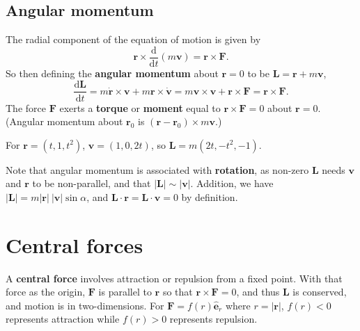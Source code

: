 \documentclass[letter-paper]{tufte-book}
\newenvironment{example}[1][Example]{\begin{trivlist}
\item[\hskip \labelsep {\bfseries #1}]}{\end{trivlist}}
\newcommand{\eb}{\boldsymbol{e}}
\newcommand{\Fb}{\boldsymbol{F}}
\newcommand{\Lb}{\boldsymbol{L}}
\newcommand{\rb}{\boldsymbol{r}}
\newcommand{\vb}{\boldsymbol{v}}
\newcommand\Def[1]{\textbf{#1}}
\begin{document}

\section{Angular momentum}

The radial component of the equation of motion is given by
\begin{equation*}
  \rb\times\frac{\mathrm{d}}{\mathrm{d}t}(m\vb) = \rb \times \Fb.
\end{equation*}
So then defining the \Def{angular momentum} about $\rb = 0$ to be $\Lb =
\rb + m\vb$,
\begin{equation*}
  \frac{\mathrm{d}\Lb}{\mathrm{d}t}
    = m\dot{\rb}\times\vb + m\rb\times\dot{\vb}
    = m\vb\times\vb + \rb\times\Fb = \rb\times\Fb.
\end{equation*}
The force $\Fb$ exerts a \Def{torque} or \Def{moment} equal to
$\rb\times\Fb = 0$ about $\rb = 0$. (Angular momentum about $\rb_0$ is $(\rb -
\rb_0)\times m\vb$.)

\begin{example}
  For $\rb = (t, 1, t^2)$, $\vb = (1, 0, 2t)$, so $\Lb = m(2t, -t^2, -1)$.
\end{example}

Note that angular momentum is associated with \Def{rotation}, as non-zero
$\Lb$ needs $\vb$ and $\rb$ to be non-parallel, and that $|\Lb|\sim |\vb|$.
Addition, we have $|\Lb| = m|\rb|~|\vb|\sin\alpha$, and $\Lb\cdot\rb =
\Lb\cdot\vb = 0$ by definition.


\chapter{Central forces}

A \Def{central force} involves attraction or repulsion from a fixed point.
With that force as the origin, $\Fb$ is parallel to $\rb$ so that $\rb\times\Fb
= 0$, and thus $\Lb$ is conserved, and motion is in two-dimensions. For $\Fb =
f(r)\hat{\eb}_r$ where $r = |\rb|$, $f(r) < 0$ represents attraction while $f(r) >
0$ represents repulsion.
\end{document}
